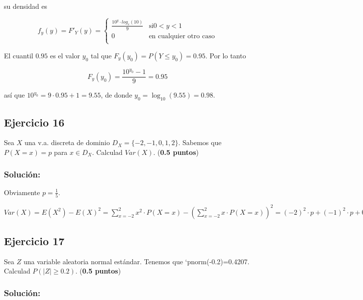 \documentclass[]{article}
\begin{document}
su densidad es

\[
f_y(y)=F'_Y(y)=\left\{\begin{array}{ll} 
\frac{10^y\cdot log_e(10)}{9} & \mbox{si} 0< y < 1\\
0 & \mbox{en cualquier otro caso}\\
\end{array}\right.
\]

El cuantil \(0.95\) es el valor \(y_0\) tal que
\(F_y(y_0)=P(Y\leq y_0)=0.95\). Por lo tanto

\[F_y(y_0)=\frac{10^{y_0}-1}{9}=0.95\]

así que \(10^{y_0}=9\cdot 0.95+1=9.55\), de donde
\(y_0=\log_{10}(9.55)=0.98.\)

\hypertarget{ejercicio-16}{%
\subsection{Ejercicio 16}\label{ejercicio-16}}

Sea \(X\) una v.a. discreta de dominio \(D_X=\{-2,-1,0,1,2\}\). Sabemos
que \(P(X=x)=p\) para \(x\in D_X\). Calculad \(Var(X)\). (\textbf{0.5
puntos})

\hypertarget{soluciuxf3n-15}{%
\subsubsection{Solución:}\label{soluciuxf3n-15}}

Obviamente \(p=\frac{1}{5}.\)

\(Var(X)=E(X^2)-E(X)^2=\displaystyle\sum_{x=-2}^{2} x^2\cdot P(X=x)-\left(\displaystyle\sum_{x=-2}^2 x\cdot P(X=x)\right)^2= (-2)^2\cdot p+(-1)^2\cdot p+0^2\cdot p+1^2\cdot p+(-2)^2\cdot p-\left(-2\cdot p -1\cdot p+0\cdot p+1\cdot p +2\cdot p\right)^2= 10\cdot p+0^2=10\cdot p=10\cdot \frac{1}{5}=2.\)

\hypertarget{ejercicio-17}{%
\subsection{Ejercicio 17}\label{ejercicio-17}}

Sea \(Z\) una variable aleatoria normal estándar. Tenemos que
`pnorm(-0.2)=0.4207. Calculad \(P(|Z|\geq 0.2)\). (\textbf{0.5 puntos})

\hypertarget{soluciuxf3n-16}{%
\subsubsection{Solución:}\label{soluciuxf3n-16}}
\end{document}
